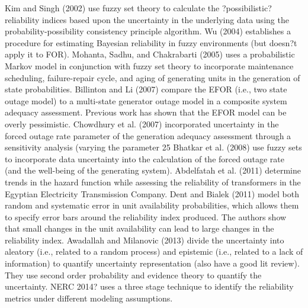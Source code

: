 \documentclass[10pt]{amsart}
\begin{document}
	Kim and Singh (2002) use fuzzy set theory to calculate the ?possibilistic? reliability indices based upon the uncertainty in the underlying data using the probability-possibility consistency principle algorithm. 
	Wu (2004) establishes a procedure for estimating Bayesian reliability in fuzzy environments (but doesn?t apply it to FOR).
	\parencite{mohanta:2005aa} Mohanta, Sadhu, and Chakrabarti (2005) uses a probabilistic Markov model in conjunction with fuzzy set theory to incorporate maintenance scheduling, failure-repair cycle, and aging of generating units in the generation of state probabilities. 
	Billinton and Li (2007) compare the EFOR (i.e., two state outage model) to a multi-state generator outage model in a composite system adequacy assessment. 
	Previous work has shown that the EFOR model can be overly pessimistic. 
	Chowdhury et al. (2007) incorporated uncertainty in the forced outage rate parameter of the generation adequacy assessment through a sensitivity analysis (varying the parameter 25%
	Bhatkar et al. (2008) use fuzzy sets to incorporate data uncertainty into the calculation of the forced outage rate (and the well-being of the generating system).  
	Abdelfatah et al. (2011) determine trends in the hazard function while assessing the reliability of transformers in the Egyptian Electricity Transmission Company.
	Dent and Bialek (2011) model both random and systematic error in unit availability probabilities, which allows them to specify error bars around the reliability index produced. The authors show that small changes in the unit availability can lead to large changes in the reliability index.  
	Awadallah and Milanovic (2013) divide the uncertainty into aleatory (i.e., related to a random process) and epistemic (i.e., related to a lack of information) to quantify uncertainty representation (also have a good lit review). They use second order probability and evidence theory to quantify the uncertainty. 
	NERC 2014? uses a three stage technique to identify the reliability metrics under different modeling assumptions. 
	
\end{document}
